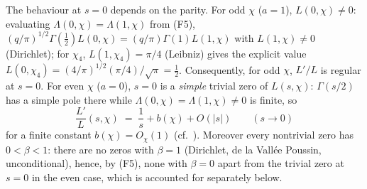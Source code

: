 The behaviour at $s=0$ depends on the parity. For odd $\chi$ ($a=1$),
$L(0,\chi)\ne0$: evaluating $\Lambda(0,\chi)=\Lambda(1,\chi)$
from (F5),
$(q/\pi)^{1/2}\Gamma(\tfrac12)L(0,\chi)=(q/\pi)\Gamma(1)L(1,\chi)$
with $L(1,\chi)\ne0$ (Dirichlet); for $\chi_4$, $L(1,\chi_4)=\pi/4$
(Leibniz) gives the explicit value
$L(0,\chi_4)=(4/\pi)^{1/2}(\pi/4)/\sqrt{\pi}=\tfrac12$.
Consequently, for odd $\chi$, $L'/L$ is regular at $s=0$. For even
$\chi$ ($a=0$), $s=0$ is a \emph{simple} trivial zero of $L(s,\chi)$:
$\Gamma(s/2)$ has a simple pole there while
$\Lambda(0,\chi)=\Lambda(1,\chi)\ne0$ is finite, so
\[
\frac{L'}{L}(s,\chi)\;=\;\frac1s+b(\chi)+O(|s|)\qquad(s\to0)
\]
for a finite constant $b(\chi)=O_\chi(1)$ (cf.\ \cite[Ch.~19]{Dav00}).
Moreover every nontrivial zero
has $0<\beta<1$: there are no zeros with $\beta=1$ (Dirichlet, de la
Vall\'ee Poussin, unconditional), hence, by (F5), none with $\beta=0$
apart from the trivial zero at $s=0$ in the even case, which is
accounted for separately below.

